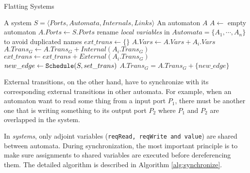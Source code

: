 \begin{algorithm}[H]
    \caption{Flatting Systems}
    \label{alg:compose}
    \begin{algorithmic}[1]
        \REQUIRE A system $S=\langle Ports, Automata, Internals, Links\rangle$
        \ENSURE An automaton $A$
        \STATE $A \leftarrow $ empty automaton
        \STATE $A.Ports\leftarrow S.Ports$
        \STATE rename \emph{local variables} in $Automata=\{A_1,\cdots,A_n\}$ to avoid duplicated names
        \STATE $ext\_trans\leftarrow \{\}$
            \STATE $A.Vars\leftarrow A.Vars + A_i.Vars$
            \STATE $A.Trans_G \leftarrow A.Trans_G + Internal(A_i.Trans_G)$
            \STATE $ext\_trans \leftarrow ext\_trans + External(A_i.Trans_G)$
        \ENDFOR
            \STATE $new\_edge\leftarrow \mbox{\texttt{Schedule}}(S, set\_trans)$ 
                \STATE $A.Trans_G = A.Trans_G + \{new\_edge\}$
            \ENDIF
        \ENDFOR
    \end{algorithmic}
\end{algorithm}

External transitions, on the other hand, have to synchronize with its corresponding external transitions in other automata. For example, when an automaton want to read some thing from a input port $P_1$, there must be another one that is writing something to its output port $P_2$ where $P_1$ and $P_2$ are overlapped in the system.

In \lang{} \emph{systems}, only adjoint variables (\texttt{reqRead, reqWrite and value}) are shared between automata. During synchronization, the most important principle is to make sure assignments to shared variables are executed before dereferencing them. The detailed algorithm is described in Algorithm \ref{alg:synchronize}.

